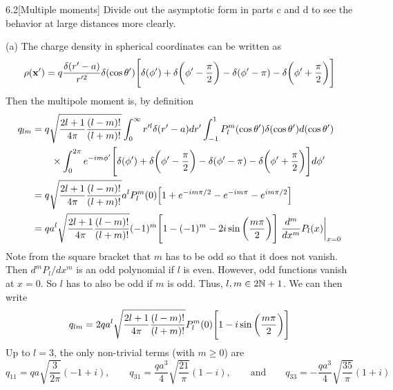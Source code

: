 \documentclass[12pt]{article}
\begin{document}
\begin{problem}{6.2}[Multiple moments]
Divide out the asymptotic form in parts c and d to see the behavior at large
distances more clearly.
\begin{solution}
(a) The charge density in spherical coordinates can be written as
\begin{equation}
    \rho(\vb{x}')=q\frac{\delta(r'-a)}{r'^2}\delta(\cos\theta')
    \qty[\delta(\phi')+\delta\qty(\phi'-\frac\pi2)-\delta(\phi'-\pi)-\delta\qty(\phi'+\frac\pi2)]
\end{equation}
Then the multipole moment is, by definition
\begin{align}
    q_{lm}
    &=q\sqrt{\frac{2l+1}{4\pi}\frac{(l-m)!}{(l+m)!}}
    \int_0^\infty r'^l\delta(r'-a)dr'
    \int_{-1}^1P_l^m(\cos\theta')\delta(\cos\theta')d(\cos\theta')\notag\\
    &\qquad\times\int_0^{2\pi}e^{-im\phi'}\qty[\delta(\phi')+\delta\qty(\phi'-\frac\pi2)-\delta(\phi'-\pi)-\delta\qty(\phi'+\frac\pi2)]d\phi'\notag\\
    &=q\sqrt{\frac{2l+1}{4\pi}\frac{(l-m)!}{(l+m)!}}
        a^lP_l^m(0)\qty[1+e^{-im\pi/2}-e^{-im\pi}-e^{im\pi/2}]\notag\\
    &=qa^l\sqrt{\frac{2l+1}{4\pi}\frac{(l-m)!}{(l+m)!}}
    (-1)^m\qty[1-(-1)^m-2i\sin\qty(\frac{m\pi}{2})]\eval{\frac{d^m}{dx^m}P_l(x)}_{x=0}
\end{align}
Note from the square bracket that $m$ has to be odd so that it does not vanish.
Then $d^mP_l /dx^m$ is an odd polynomial if $l$ is even. However, odd
functions vanish at $x=0$. So $l$ has to also be odd if $m$ is odd. Thus,
$l,m\in 2\mathbb{N}+1$. We can then write
\begin{equation}
    q_{lm}=2qa^l\sqrt{\frac{2l+1}{4\pi}\frac{(l-m)!}{(l+m)!}}P_l^m(0)\qty[1-i\sin\qty(\frac{m\pi}{2})] 
\end{equation}
Up to $l=3$, the only non-trivial terms (with $m\geq 0$) are
\begin{equation}
    q_{11}=qa\sqrt{\frac{3}{2\pi}}(-1+i),
    \qquad q_{31}=\frac{qa^3}{4}\sqrt{\frac{21}{\pi}}(1-i),
    \qquad\text{and}\qquad
    q_{33}=-\frac{qa^3}{4}\sqrt{\frac{35}{\pi}}(1+i)
\end{equation}


\end{solution}
\end{problem}
\end{document}
